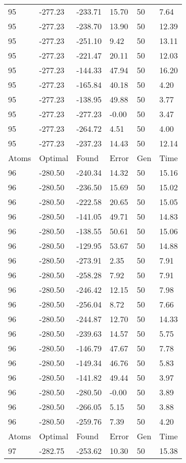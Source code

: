 \documentclass{report}
\begin{document}
\begin{appendix}
\begin{longtable}{llllll}
95 & -277.23 & -233.71 & 15.70 & 50 & 7.64 \\
95 & -277.23 & -238.70 & 13.90 & 50 & 12.39 \\
95 & -277.23 & -251.10 & 9.42 & 50 & 13.11 \\
95 & -277.23 & -221.47 & 20.11 & 50 & 12.03 \\
95 & -277.23 & -144.33 & 47.94 & 50 & 16.20 \\
95 & -277.23 & -165.84 & 40.18 & 50 & 4.20 \\
95 & -277.23 & -138.95 & 49.88 & 50 & 3.77 \\
95 & -277.23 & -277.23 & -0.00 & 50 & 3.47 \\
95 & -277.23 & -264.72 & 4.51 & 50 & 4.00 \\
95 & -277.23 & -237.23 & 14.43 & 50 & 12.14 \\
Atoms & Optimal & Found & Error & Gen & Time \\
96 & -280.50 & -240.34 & 14.32 & 50 & 15.16 \\
96 & -280.50 & -236.50 & 15.69 & 50 & 15.02 \\
96 & -280.50 & -222.58 & 20.65 & 50 & 15.05 \\
96 & -280.50 & -141.05 & 49.71 & 50 & 14.83 \\
96 & -280.50 & -138.55 & 50.61 & 50 & 15.06 \\
96 & -280.50 & -129.95 & 53.67 & 50 & 14.88 \\
96 & -280.50 & -273.91 & 2.35 & 50 & 7.91 \\
96 & -280.50 & -258.28 & 7.92 & 50 & 7.91 \\
96 & -280.50 & -246.42 & 12.15 & 50 & 7.98 \\
96 & -280.50 & -256.04 & 8.72 & 50 & 7.66 \\
96 & -280.50 & -244.87 & 12.70 & 50 & 14.33 \\
96 & -280.50 & -239.63 & 14.57 & 50 & 5.75 \\
96 & -280.50 & -146.79 & 47.67 & 50 & 7.78 \\
96 & -280.50 & -149.34 & 46.76 & 50 & 5.83 \\
96 & -280.50 & -141.82 & 49.44 & 50 & 3.97 \\
96 & -280.50 & -280.50 & -0.00 & 50 & 3.89 \\
96 & -280.50 & -266.05 & 5.15 & 50 & 3.88 \\
96 & -280.50 & -259.76 & 7.39 & 50 & 4.20 \\
Atoms & Optimal & Found & Error & Gen & Time \\
97 & -282.75 & -253.62 & 10.30 & 50 & 15.38 \\

\end{longtable}
\end{appendix}
\end{document}
